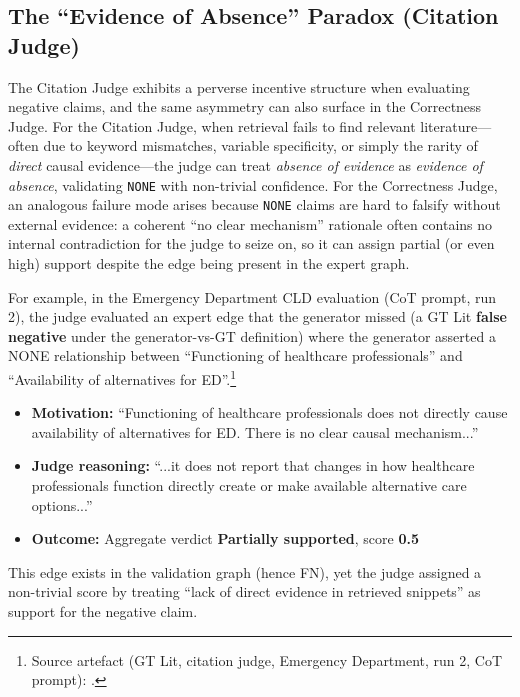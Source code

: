 \subsection{The ``Evidence of Absence'' Paradox (Citation Judge)}

The Citation Judge exhibits a perverse incentive structure when evaluating negative claims, and the same asymmetry can also surface in the Correctness Judge. For the Citation Judge, when retrieval fails to find relevant literature---often due to keyword mismatches, variable specificity, or simply the rarity of \textit{direct} causal evidence---the judge can treat \textit{absence of evidence} as \textit{evidence of absence}, validating \texttt{NONE} with non-trivial confidence. For the Correctness Judge, an analogous failure mode arises because \texttt{NONE} claims are hard to falsify without external evidence: a coherent ``no clear mechanism'' rationale often contains no internal contradiction for the judge to seize on, so it can assign partial (or even high) support despite the edge being present in the expert graph.

For example, in the Emergency Department CLD evaluation (CoT prompt, run 2), the judge evaluated an expert edge that the generator missed (a GT Lit \textbf{false negative} under the generator-vs-GT definition) where the generator asserted a NONE relationship between ``Functioning of healthcare professionals'' and ``Availability of alternatives for ED''.\footnote{Source artefact (GT Lit, citation judge, Emergency Department, run 2, CoT prompt): .}%
\begin{itemize}[noitemsep]
    \item \textbf{Motivation:} ``Functioning of healthcare professionals does not directly cause availability of alternatives for ED. There is no clear causal mechanism...''
    \item \textbf{Judge reasoning:} ``...it does not report that changes in how healthcare professionals function directly create or make available alternative care options...''
    \item \textbf{Outcome:} Aggregate verdict \textbf{Partially supported}, score \textbf{0.5}
\end{itemize}

This edge exists in the validation graph (hence FN), yet the judge assigned a non-trivial score by treating ``lack of direct evidence in retrieved snippets'' as support for the negative claim.

